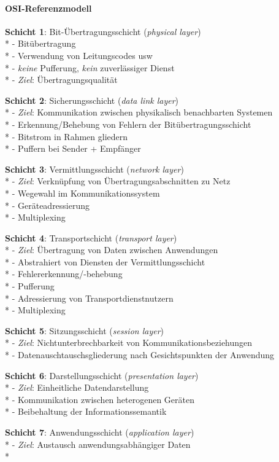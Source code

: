 \paragraph{OSI-Referenzmodell}
\begin{items}
  \item \textbf{Schicht 1}: Bit-Übertragungsschicht (\emph{physical layer}) \\*
    - Bitübertragung \\*
    - Verwendung von Leitungscodes usw \\*
    - \emph{keine} Pufferung, \emph{kein} zuverlässiger Dienst \\*
    - \emph{Ziel}: Übertragungsqualität
  \item \textbf{Schicht 2}: Sicherungsschicht (\emph{data link layer}) \\*
    - \emph{Ziel}: Kommunikation zwischen physikalisch benachbarten Systemen \\*
    - Erkennung/Behebung von Fehlern der Bitübertragungsschicht \\*
    - Bitstrom in Rahmen gliedern \\*
    - Puffern bei Sender + Empfänger
  \item \textbf{Schicht 3}: Vermittlungsschicht (\emph{network layer}) \\*
    - \emph{Ziel}: Verknüpfung von Übertragungsabschnitten zu Netz \\*
    - Wegewahl im Kommunikationssystem \\*
    - Geräteadressierung \\*
    - Multiplexing
  \item \textbf{Schicht 4}: Transportschicht (\emph{transport layer}) \\*
    - \emph{Ziel}: Übertragung von Daten zwischen Anwendungen \\*
    - Abstrahiert von Diensten der Vermittlungsschicht \\*
    - Fehlererkennung/-behebung \\*
    - Pufferung \\*
    - Adressierung von Transportdienstnutzern \\*
    - Multiplexing
  \item \textbf{Schicht 5}: Sitzungsschicht (\emph{session layer}) \\*
    - \emph{Ziel}: Nichtunterbrechbarkeit von Kommunikationsbeziehungen \\*
    - Datenauschtauschsgliederung nach Gesichtspunkten der Anwendung
  \item \textbf{Schicht 6}: Darstellungsschicht (\emph{presentation layer}) \\*
    - \emph{Ziel}: Einheitliche Datendarstellung \\*
    - Kommunikation zwischen heterogenen Geräten \\*
    - Beibehaltung der Informationssemantik
  \item \textbf{Schicht 7}: Anwendungsschicht (\emph{application layer}) \\*
    - \emph{Ziel}: Austausch anwendungsabhängiger Daten \\*
\end{items}
